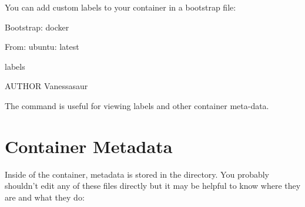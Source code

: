 \documentclass[letterpaper,10pt,english]{sphinxmanual}
\begin{document}
You can add custom labels to your container in a bootstrap file:

%
\begin{sphinxVerbatim}[commandchars=\\\{\}]
Bootstrap: docker

From: ubuntu: latest



\PYGZpc{}labels

AUTHOR Vanessasaur
\end{sphinxVerbatim}

The  command is useful for viewing labels and other container meta-data.


\section{Container Metadata}
\label{\detokenize{environment_and_metadata:container-metadata}}
Inside of the container, metadata is stored in the  directory. You
probably shouldn’t edit any of these files directly but it may be
helpful to know where they are and what they do:
\end{document}
